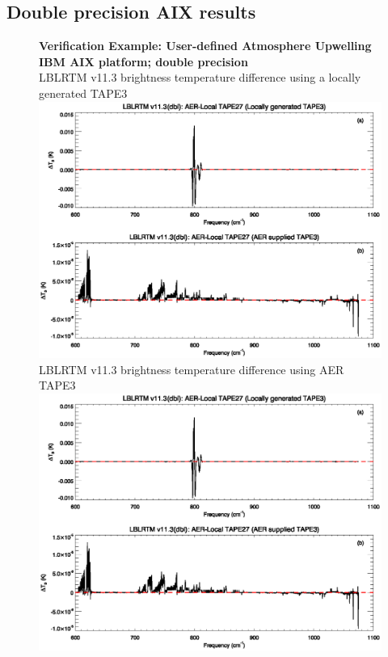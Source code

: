 \subsection{Double precision AIX results}
\begin{figure}[htp]
  \centering
  \qquad\sffamily\textbf{Verification Example: User-defined Atmosphere Upwelling}\\
  \qquad\sffamily\textbf{IBM AIX platform; double precision}\\
  \qquad\textsf{LBLRTM v11.3 brightness temperature difference using a locally generated TAPE3}\\
  \includegraphics[bb=85 403 534 558,clip,scale=1.0]{graphics/run_example_user_defined_upwelling/dbl_ibm.eps}
  \qquad\textsf{LBLRTM v11.3 brightness temperature difference using AER TAPE3}\\
  \includegraphics[bb=85 226 534 381,clip,scale=1.0]{graphics/run_example_user_defined_upwelling/dbl_ibm.eps}

\end{figure}
